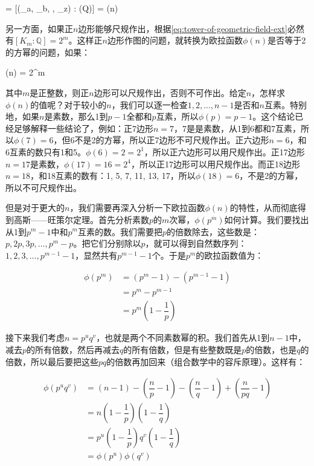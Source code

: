 \be
[K_m : \mathbb{Q}] = [(\zeta_a, \zeta_b, \dotsc, \zeta_z) : \mathbb(Q)] = \phi(n)
\ee

另一方面，如果正$n$边形能够尺规作出，根据\cref{eq:tower-of-geometric-field-ext}必然有$[K_m : \mathbb{Q}] = 2^m$。这样正$n$边形作图的问题，就转换为欧拉函数$\phi(n)$是否等于2的方幂的问题，如果：

\be
\phi(n) = 2^m
\label{eq:euler-function-as-power-of-2}
\ee

其中$m$是正整数，则正$n$边形可以尺规作出，否则不可作出。给定$n$，怎样求$\phi(n)$的值呢？对于较小的$n$，我们可以逐一检查$1, 2, \dotsc, n - 1$是否和$n$互素。特别地，如果$n$是素数，那么1到$p-1$全都和$p$互素，所以$\phi(p) = p - 1$。这个结论已经足够解释一些结论了，例如：正7边形$n = 7$，7是是素数，从1到6都和7互素，所以$\phi(7) = 6$，但6不是2的方幂，所以正7边形不可尺规作出。正六边形$n = 6$，和6互素的数只有1和5。$\phi(6) = 2 = 2^1$，所以正六边形可以用尺规作出。正17边形$n = 17$是素数，$\phi(17) = 16 = 2^4$，所以正17边形可以用尺规作出。而正18边形$n = 18$，和18互素的数有：1, 5, 7, 11, 13, 17，所以$\phi(18) = 6$，不是2的方幂，所以不可尺规作出。

但是对于更大的$n$，我们需要再深入分析一下欧拉函数$\phi(n)$的特性，从而彻底得到高斯——旺策尔定理。首先分析素数$p$的$m$次幂，$\phi(p^m)$如何计算。我们要找出从1到$p^m-1$中和$p^m$互素的数。我们需要把$p$的倍数除去，这些数是：$p, 2p, 3p, \dotsc, p^m - p$。把它们分别除以$p$，就可以得到自然数序列：$1, 2, 3, ..., p^{m-1} - 1$，显然共有$p^{m-1} - 1$个。于是$p^m$的欧拉函数值为：

\begin{align*}
\phi(p^m) &= (p^m - 1) - (p^{m-1} - 1) \\
            &= p^m - p^{m-1} \\
            &= p^m(1-\dfrac{1}{p})
\end{align*}

接下来我们考虑$n = p^uq^v$，也就是两个不同素数幂的积。我们首先从1到$n-1$中，减去$p$的所有倍数，然后再减去$q$的所有倍数，但是有些整数既是$p$的倍数，也是$q$的倍数，所以最后要把这些$pq$的倍数再加回来（组合数学中的容斥原理）。这样有：

\begin{align*}
\phi(p^uq^v) &=  (n - 1) - (\dfrac{n}{p} - 1) - (\dfrac{n}{q} - 1) + (\dfrac{n}{pq} - 1) \\
          &=  n(1 - \dfrac{1}{p})(1 - \dfrac{1}{q}) \\[5pt]
          &=  p^u(1 - \dfrac{1}{p})q^v(1 - \dfrac{1}{q}) \\[5pt]
          &=  \phi(p^u)\phi(q^v)
\end{align*}

